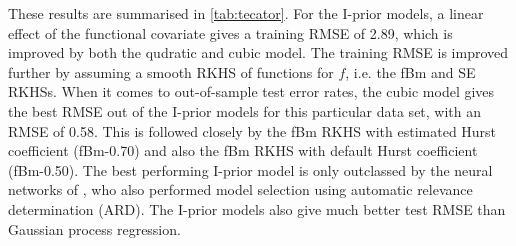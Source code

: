 \documentclass[showframe,11pt,twoside,openright]{report}\usepackage[]{graphicx}\usepackage{xcolor}
\begin{document}
These results are summarised in \cref{tab:tecator}.
For the I-prior models, a linear effect of the functional covariate gives a training RMSE of 2.89, which is improved by both the qudratic and cubic model.
The training RMSE is improved further by assuming a smooth RKHS of functions for $f$, i.e. the fBm and SE RKHSs.
When it comes to out-of-sample test error rates, the cubic model gives the best RMSE out of the I-prior models for this particular data set, with an RMSE of 0.58.
This is followed closely by the fBm RKHS with estimated Hurst coefficient (fBm-0.70) and also the fBm RKHS with default Hurst coefficient (fBm-0.50).
The best performing I-prior model is only outclassed by the neural networks of \citet{thodberg1996review}, who also performed model selection using automatic relevance determination (ARD).
The I-prior models also give much better test RMSE than Gaussian process regression.
\end{document}

